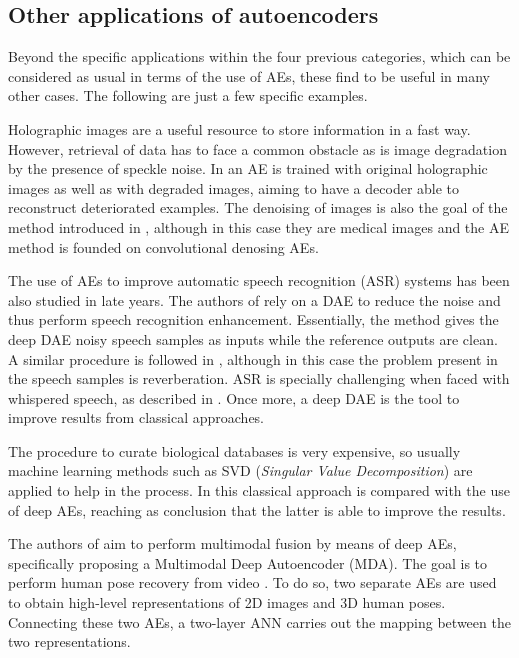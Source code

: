 \subsection{Other applications of autoencoders}
Beyond the specific applications within the four previous categories, which can be considered as usual in terms of the use of AEs, these find to be useful in many other cases. The following are just a few specific examples.

Holographic images  are a useful resource to store information in a fast way. However, retrieval of data has to face a common obstacle as is image degradation by the presence of speckle noise. In  an AE is trained with original holographic images as well as with degraded images, aiming to have a decoder able to reconstruct deteriorated examples. The denoising of images is also the goal of the method introduced in , although in this case they are medical images and the AE method is founded on convolutional denosing AEs.

The use of AEs to improve automatic speech recognition (ASR) systems has been also studied in late years. The authors of  rely on a DAE to reduce the noise and thus perform speech recognition enhancement. Essentially, the method gives the deep DAE noisy speech samples as inputs while the reference outputs are clean. A similar procedure is followed in , although in this case the problem present in the speech samples is reverberation. ASR is specially challenging when faced with whispered speech, as described in . Once more, a deep DAE is the tool to improve results from classical approaches.

The procedure to curate biological databases is very expensive, so usually machine learning methods such as SVD (\textit{Singular Value Decomposition})  are applied to help in the process. In  this classical approach is compared with the use of deep AEs, reaching as conclusion that the latter is able to improve the results.

The authors of   aim to perform multimodal fusion by means of deep AEs, specifically proposing a Multimodal Deep Autoencoder (MDA). The goal is to perform human pose recovery from video . To do so, two separate AEs are used to obtain high-level representations of 2D images and 3D human poses. Connecting these two AEs, a two-layer ANN carries out the mapping between the two representations.

